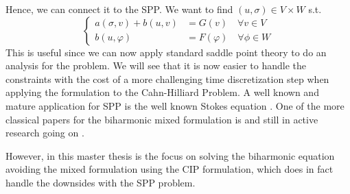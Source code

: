 Hence, we can connect it to the SPP. We want to find $( u,\sigma ) \in V \times W$ s.t.  \[
    \begin{cases}
       a( \sigma ,v) + b ( u, v )  & = G( v)   \quad  \forall v \in V \\
       b( u, \varphi  )  & = F( \varphi )     \quad \forall \phi \in W
    \end{cases}
\]
This is useful since we can now apply standard saddle point theory to do an analysis for the problem. We will see that it is now easier to handle the constraints with the cost of a more challenging time discretization step when applying the formulation to the Cahn-Hilliard Problem.
A well known and mature application for SPP is the well known Stokes equation \cite{john2016finite, knabner2003numerical}. One of the more classical papers for the biharmonic mixed formulation is and still in active research going on \cite{babuvska1980analysis,cai2023nitsche}.

However, in this master thesis is the focus on solving the biharmonic equation avoiding the mixed formulation using the CIP formulation, which does in fact handle the downsides with the SPP problem.



